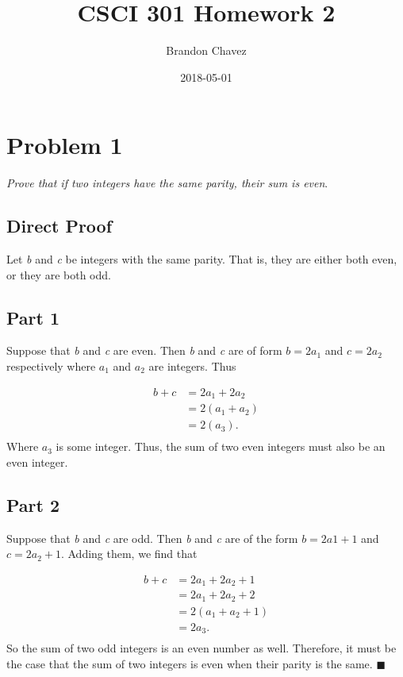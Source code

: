 \documentclass{article}
\title{CSCI 301 Homework 2}
\date{2018-05-01}
\author{Brandon Chavez}
\newcommand*{\QEDA}{\hfill\ensuremath{\blacksquare}}%
\begin{document}
	\maketitle
	\newpage
	
	\section{Problem 1} \textit{Prove that if two integers have the same parity, their sum is even}.
	
		\subsection{Direct Proof}
		Let \textit{b} and \textit{c} be integers with the same parity. That is, they are either both even, or they 		are both odd.	
		\subsection{Part 1} Suppose that \textit{b} and \textit{c} are even. Then \textit{b} and \textit{c} are 
		of form $b = 2a_1$ and $c = 2a_2$ respectively where $a_1$ and $a_2$ 
		are integers. Thus
			
			\begin{align*}
			b + c &= 2a_1 + 2a_2\\
			&= 2(a_1 + a_2)\\
			&= 2(a_3).\\
			\end{align*}
			Where $a_3$ is some integer. Thus, the sum of two even integers must also be an even 				integer.
		\subsection{Part 2} Suppose that \textit{b} and \textit{c} are odd. Then \textit{b} and \textit{c} are of 			the form $b = 2a1 +1$ and $c = 2a_2 +1$. Adding them, we find that
		
			\begin{align*}
			b + c &= 2a_1 + 2a_2 + 1\\
			&= 2a_1 + 2a_2 + 2\\
			&= 2(a_1 + a_2 +1)\\
			&= 2a_3.\\
			\end{align*}
			So the sum of two odd integers is an even number as well. Therefore, it must be the case that the sum of two integers is even when their parity is the same. \QEDA
	
\end{document}
